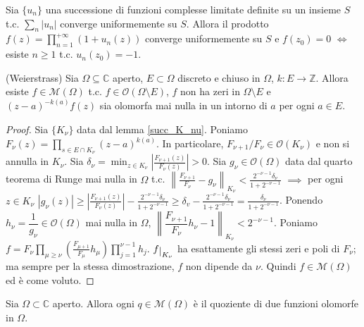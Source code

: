 \begin{exc}
  Sia $\{u_n\}$ una successione di funzioni complesse limitate definite su un insieme $S$ t.c. $\displaystyle \sum_{n} |u_n|$ converge uniformemente su $S$. Allora il prodotto $\displaystyle f(z)=\prod_{n=1}^{+\infty} (1+u_n(z))$ converge uniformemente su $S$ e $f(z_0)=0$ $\iff$ esiste $n \ge 1$ t.c. $u_n(z_0)=-1$.
\end{exc}

\begin{thm}
  (Weierstrass) Sia $\Omega \subseteq \mathbb{C}$ aperto, $E \subset \Omega$ discreto e chiuso in $\Omega$, $k:E \longrightarrow \mathbb{Z}$. Allora esiste $f \in \mathcal{M}(\Omega)$ t.c. $f \in \mathcal{O}(\Omega \setminus E)$, $f$ non ha zeri in $\Omega \setminus E$ e $(z-a)^{-k(a)}f(z)$ sia olomorfa mai nulla in un intorno di $a$ per ogni $a \in E$.
\end{thm}

\begin{proof}
  Sia $\{K_{\nu}\}$ data dal lemma \ref{succ_K_nu}. Poniamo $\displaystyle F_{\nu}(z)=\prod_{s \in E \cap K_{\nu}} (z-a)^{k(a)}$. In particolare, $F_{\nu+1}/F_{\nu} \in \mathcal{O}(K_{\nu})$ e non si annulla in $K_{\nu}$.
  Sia $\displaystyle \delta_{\nu}=\min_{z \in K_{\nu}} \left|\frac{F_{\nu+1}(z)}{F_{\nu}(z)}\right|>0$.
  Sia $g_{\nu} \in \mathcal{O}(\Omega)$ data dal quarto teorema di Runge mai nulla in $\Omega$ t.c. $\displaystyle \left\|\frac{F_{\nu+1}}{F_{\nu}}-g_{\nu}\right\|_{K_{\nu}}<\frac{2^{-\nu-1}\delta_{\nu}}{1+2^{-\nu-1}}$
  $\implies$ per ogni $z \in K_{\nu}$ $\displaystyle |g_{\nu}(z)| \ge \left|\frac{F_{\nu+1}(z)}{F_{\nu}(z)}\right|-\frac{2^{-\nu-1}\delta_{\nu}}{1+2^{-\nu-1}} \ge \delta_v-\frac{2^{-\nu-1}\delta_{\nu}}{1+2^{-\nu-1}}=\frac{\delta_{\nu}}{1+2^{-\nu-1}}$.
  Ponendo $h_{\nu}=\dfrac{1}{g_{\nu}} \in \mathcal{O}(\Omega)$ mai nulla in $\Omega$, $\left \|\dfrac{F_{\nu+1}}{F_{\nu}}h_{\nu}-1\right\|_{K_{\nu}}<2^{-\nu-1}$.
  Poniamo $\displaystyle f=F_{\nu}\prod_{\mu\ge\nu}\left(\frac{F_{\mu+1}}{F_{\mu}}h_{\mu}\right) \prod_{j=1}^{\nu-1}h_j$. $f\restrict{K_{\nu}}$ ha esattamente gli stessi zeri e poli di $F_{\nu}$; ma sempre per la stessa dimostrazione, $f$ non dipende da $\nu$. Quindi $f \in \mathcal{M}(\Omega)$ ed è come voluto.
\end{proof}

\begin{cor}
  Sia $\Omega \subset \mathbb{C}$ aperto. Allora ogni $q \in \mathcal{M}(\Omega)$ è il quoziente di due funzioni olomorfe in $\Omega$.
\end{cor}

